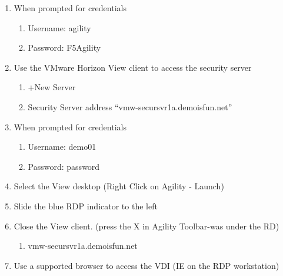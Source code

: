 \documentclass[letterpaper,10pt,english]{sphinxmanual}
\begin{document}
\begin{enumerate}
\item {} 
When prompted for credentials
\begin{enumerate}
\item {} 
Username: agility

\item {} 
Password: F5Agility


\end{enumerate}

\item {} 
Use the VMware Horizon View client to access the security server
\begin{enumerate}
\item {} 
+New Server

\item {} 
Security Server address “vmw-secursvr1a.demoisfun.net”

\end{enumerate}

\item {} 
When prompted for credentials
\begin{enumerate}
\item {} 
Username: demo01

\item {} 
Password: password

\end{enumerate}

\item {} 
Select the View desktop (Right Click on Agility - Launch)

\item {} 
Slide the blue RDP indicator to the left

\item {} 
Close the View client. (press the X in Agility Toolbar-was under the
RD)
\begin{enumerate}
\item {} 
vmw-secursvr1a.demoisfun.net

\end{enumerate}

\item {} 
Use a supported browser to access the VDI (IE on the RDP
workstation)



\end{enumerate}
\end{document}
